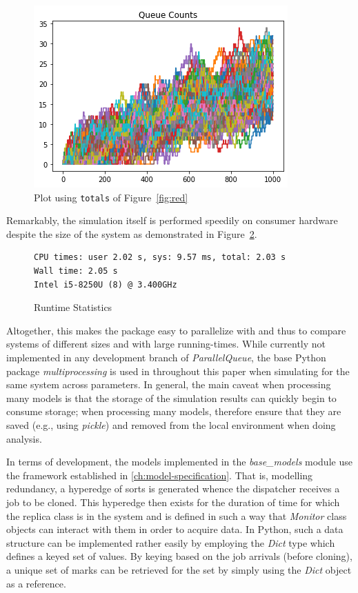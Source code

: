 \begin{figure}
    \centering
    \includegraphics[scale=0.8]{redundancy}
    \caption{Plot using \lstinline{totals} of Figure~\ref{fig:red}}
    \label{fig:redpic}
\end{figure}

Remarkably, the simulation itself is performed speedily on consumer hardware despite the size of the system as demonstrated in Figure~\ref{fig:lstlisting2}.
\begin{figure}
     \begin{lstlisting}
CPU times: user 2.02 s, sys: 9.57 ms, total: 2.03 s
Wall time: 2.05 s
Intel i5-8250U (8) @ 3.400GHz
     \end{lstlisting}
     \centering
     \caption{Runtime Statistics}
     \label{fig:lstlisting2}
\end{figure}


Altogether, this makes the package easy to parallelize with and thus to compare systems of different sizes
and with large running-times.
While currently not implemented in any development branch of \textit{ParallelQueue}, the base Python package
\textit{multiprocessing} is used in throughout this paper when simulating for the same system across parameters.
In general, the main caveat when processing many models is that the storage of the simulation results can quickly begin
to consume storage;
when processing many models, therefore ensure that they are saved (e.g., using \textit{pickle}) and removed from
the local environment when doing analysis.

In terms of development, the models implemented in the \textit{base_models} module use the framework established in
\ref{ch:model-specification}.
That is, modelling redundancy, a hyperedge of sorts is generated whence the dispatcher
receives a job to be cloned.
This hyperedge then exists for the duration of time for which the replica class is in the system and is defined in such
a way that \textit{Monitor} class objects can interact with them in order to acquire data.
In Python, such a data structure can be implemented rather easily by employing the \textit{Dict} type which defines
a keyed set of values.
By keying based on the job arrivals (before cloning), a unique set of marks can be retrieved for the set by simply using
the \textit{Dict} object as a reference.

